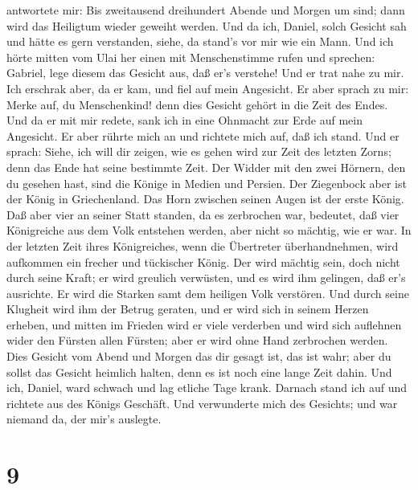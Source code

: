 antwortete mir: Bis zweitausend dreihundert Abende und Morgen um sind;
dann wird das Heiligtum wieder geweiht werden.  Und da ich,
Daniel, solch Gesicht sah und hätte es gern verstanden, siehe, da
stand's vor mir wie ein Mann.  Und ich hörte mitten vom
Ulai her einen mit Menschenstimme rufen und sprechen: Gabriel, lege
diesem das Gesicht aus, daß er's verstehe!  Und er trat
nahe zu mir. Ich erschrak aber, da er kam, und fiel auf mein Angesicht.
Er aber sprach zu mir: Merke auf, du Menschenkind! denn dies Gesicht
gehört in die Zeit des Endes.  Und da er mit mir redete,
sank ich in eine Ohnmacht zur Erde auf mein Angesicht. Er aber rührte
mich an und richtete mich auf, daß ich stand.  Und er
sprach: Siehe, ich will dir zeigen, wie es gehen wird zur Zeit des
letzten Zorns; denn das Ende hat seine bestimmte Zeit.  Der
Widder mit den zwei Hörnern, den du gesehen hast, sind die Könige in
Medien und Persien.  Der Ziegenbock aber ist der König in
Griechenland. Das Horn zwischen seinen Augen ist der erste König.
 Daß aber vier an seiner Statt standen, da es zerbrochen
war, bedeutet, daß vier Königreiche aus dem Volk entstehen werden, aber
nicht so mächtig, wie er war.  In der letzten Zeit ihres
Königreiches, wenn die Übertreter überhandnehmen, wird aufkommen ein
frecher und tückischer König.  Der wird mächtig sein, doch
nicht durch seine Kraft; er wird greulich verwüsten, und es wird ihm
gelingen, daß er's ausrichte. Er wird die Starken samt dem heiligen Volk
verstören.  Und durch seine Klugheit wird ihm der Betrug
geraten, und er wird sich in seinem Herzen erheben, und mitten im
Frieden wird er viele verderben und wird sich auflehnen wider den
Fürsten allen Fürsten; aber er wird ohne Hand zerbrochen werden.
 Dies Gesicht vom Abend und Morgen das dir gesagt ist, das
ist wahr; aber du sollst das Gesicht heimlich halten, denn es ist noch
eine lange Zeit dahin.  Und ich, Daniel, ward schwach und
lag etliche Tage krank. Darnach stand ich auf und richtete aus des
Königs Geschäft. Und verwunderte mich des Gesichts; und war niemand da,
der mir's auslegte.

\hypertarget{section-8}{%
\section{9}\label{section-8}}

